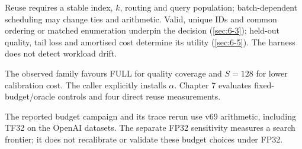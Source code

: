 Reuse requires a stable index, $k$, routing and query population;
batch-dependent scheduling may change ties and arithmetic. Valid, unique
IDs and common ordering or matched enumeration underpin the decision
(\cref{sec:6-3}); held-out quality, tail loss and amortised cost determine
its utility (\cref{sec:6-5}). The harness does not detect workload drift.


The observed family favours FULL for quality coverage and $S=128$ for
lower calibration cost. The caller explicitly installs $\alpha$.
Chapter 7 evaluates fixed-budget/oracle controls and four direct reuse
measurements.

The reported budget campaign and its trace rerun use v69 arithmetic,
including TF32 on the OpenAI datasets. The separate FP32 sensitivity
measures a search frontier; it does not recalibrate or validate these
budget choices under FP32.
